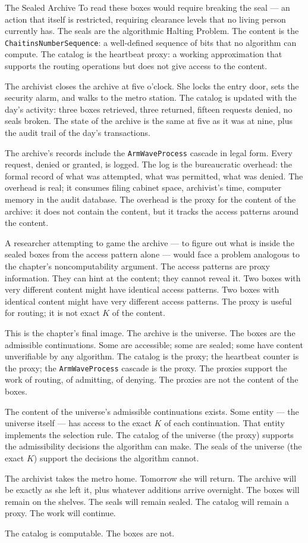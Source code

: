 \begin{coda}{The Sealed Archive}
To read these boxes would require breaking the seal --- an
action that itself is restricted, requiring clearance levels
that no living person currently has. The seals are the
algorithmic Halting Problem. The content is the
\texttt{ChaitinsNumberSequence}: a well-defined sequence of
bits that no algorithm can compute. The catalog is the
heartbeat proxy: a working approximation that supports the
routing operations but does not give access to the content.

The archivist closes the archive at five o'clock. She locks
the entry door, sets the security alarm, and walks to the
metro station. The catalog is updated with the day's
activity: three boxes retrieved, three returned, fifteen
requests denied, no seals broken. The state of the archive is
the same at five as it was at nine, plus the audit trail of
the day's transactions.

The archive's records include the
\texttt{ArmWaveProcess} cascade in legal form. Every request,
denied or granted, is logged. The log is the bureaucratic
overhead: the formal record of what was attempted, what was
permitted, what was denied. The overhead is real; it consumes
filing cabinet space, archivist's time, computer memory in the
audit database. The overhead is the proxy for the content of
the archive: it does not contain the content, but it tracks
the access patterns around the content.

A researcher attempting to game the archive --- to figure out
what is inside the sealed boxes from the access pattern alone
--- would face a problem analogous to the chapter's
noncomputability argument. The access patterns are proxy
information. They can hint at the content; they cannot
reveal it. Two boxes with very different content might have
identical access patterns. Two boxes with identical content
might have very different access patterns. The proxy is
useful for routing; it is not exact $K$ of the content.

This is the chapter's final image. The archive is the
universe. The boxes are the admissible continuations. Some
are accessible; some are sealed; some have content
unverifiable by any algorithm. The catalog is the proxy;
the heartbeat counter is the proxy; the
\texttt{ArmWaveProcess} cascade is the proxy. The proxies
support the work of routing, of admitting, of denying. The
proxies are not the content of the boxes.

The content of the universe's admissible continuations
exists. Some entity --- the universe itself --- has access
to the exact $K$ of each continuation. That entity
implements the selection rule. The catalog of the
universe (the proxy) supports the admissibility decisions
the algorithm can make. The seals of the universe (the
exact $K$) support the decisions the algorithm cannot.

The archivist takes the metro home. Tomorrow she will return.
The archive will be exactly as she left it, plus whatever
additions arrive overnight. The boxes will remain on the
shelves. The seals will remain sealed. The catalog will
remain a proxy. The work will continue.

The catalog is computable. The boxes are not.

\end{coda}
